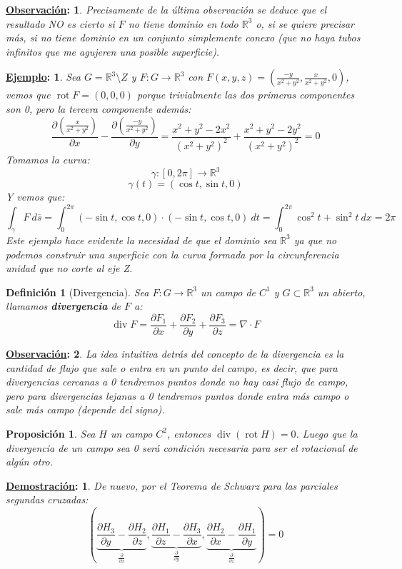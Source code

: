 \documentclass[10pt,a4paper,openright]{book}
\theoremstyle{break}
\newtheorem*{defi}{Definición}
\newtheorem*{prop}{Proposición}
\newtheorem*{demo}{\underline{Demostración}:}
\newtheorem*{obs}{\underline{Observación}:}
\newtheorem*{ej}{\underline{Ejemplo}:}
\DeclareMathOperator{\rot}{rot}
\DeclareMathOperator{\divg}{div}
\newcommand{\dif}[1]{\ d#1}
\begin{document}
\begin{obs}
Precisamente de la última observación se deduce que el resultado NO es cierto si $F$ no tiene dominio en todo $\mathbb{R}^3$ o, si se quiere precisar más, si no tiene dominio en un conjunto simplemente conexo (que no haya tubos infinitos que me agujeren una posible superficie).
\end{obs}

\begin{ej}
Sea $G = \mathbb{R}^3 \setminus Z$ y $F: G \rightarrow \mathbb{R}^3$ con $F\left( x, y, z \right) = \left( \frac{-y}{x^2 + y^2}, \frac{x}{x^2 + y^2}, 0 \right)$, vemos que $\rot F = \left( 0, 0, 0 \right)$ porque trivialmente las dos primeras componentes son 0, pero la tercera componente además:
$$\frac{\partial \left( \frac{x}{x^2 + y^2} \right)}{\partial x} - \frac{\partial \left( \frac{-y}{x^2 + y^2} \right)}{\partial y} = \frac{x^2 + y^2 - 2x^2}{\left( x^2 + y^2 \right)^2} + \frac{x^2 + y^2 - 2y^2}{\left( x^2 + y^2 \right)^2} = 0$$
Tomamos la curva:
$$\gamma: \left[ 0, 2\pi \right] \rightarrow \mathbb{R}^3$$
$$\gamma\left( t \right) = \left( \cos t, \sin t, 0 \right)$$
Y vemos que:
$$\int_{\gamma} F \dif{\overline{s}} = \int_{0}^{2\pi} \left( -\sin t, \cos t, 0 \right) \cdot \left( -\sin t, \cos t, 0 \right) \dif{t} = \int_{0}^{2\pi} \cos^2 t + \sin^2t \dif{x} = 2\pi$$
Este ejemplo hace evidente la necesidad de que el dominio sea $\mathbb{R}^3$ ya que no podemos construir una superficie con la curva formada por la circunferencia unidad que no corte al eje Z.
\end{ej} 

\begin{defi}[Divergencia]
Sea $F: G \rightarrow \mathbb{R}^3$ un campo de $C^1$ y $G \subset \mathbb{R}^3$ un abierto, llamamos \textbf{divergencia} de $F$ a: 
$$\divg F = \frac{\partial F_1}{\partial x} + \frac{\partial F_2}{\partial y} + \frac{\partial F_3}{\partial z} = \nabla \cdot F$$
\end{defi}

\begin{obs}
La idea intuitiva detrás del concepto de la divergencia es la cantidad de flujo que sale o entra en un punto del campo, es decir, que para divergencias cercanas a 0 tendremos puntos donde no hay casi flujo de campo, pero para divergencias lejanas a 0 tendremos puntos donde entra más campo o sale más campo (depende del signo).
\end{obs}

\begin{prop}
Sea $H$ un campo $C^2$, entonces $\divg \left( \rot H \right) = 0$. Luego que la divergencia de un campo sea 0 será condición necesaria para ser el rotacional de algún otro.
\end{prop}
\begin{demo}
De nuevo, por el Teorema de Schwarz para las parciales segundas cruzadas:
$$\left( \underbrace{\frac{\partial H_3}{\partial y} - \frac{\partial H_2}{\partial z}}_{\frac{\partial }{\partial x}}, \underbrace{\frac{\partial H_1}{\partial z} - \frac{\partial H_3}{\partial x}}_{\frac{\partial }{\partial y}}, \underbrace{\frac{\partial H_2}{\partial x} - \frac{\partial H_1}{\partial y}}_{\frac{\partial }{\partial z}} \right) = 0$$
\end{demo}
\end{document}
